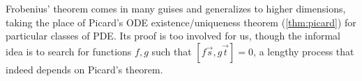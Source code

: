 Frobenius' theorem comes in many guises and generalizes to higher dimensions, taking the place of Picard's ODE existence/uniqueness theorem (\ref{thm:picard}) for particular classes of PDE. Its proof is too involved for us, though the informal idea is to search for functions $f,g$ such that $[f\vec s,g\vec t]=0$, a lengthy process that indeed depends on Picard's theorem.







